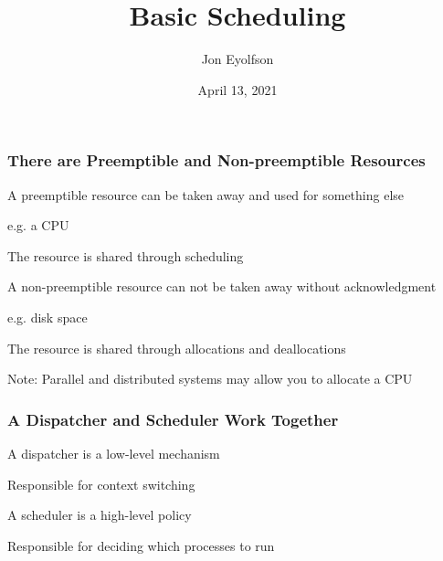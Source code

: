 

\title{Basic Scheduling}
\author{Jon Eyolfson}
\date{April 13, 2021}


  \begin{frame}
    \titlepage
  \end{frame}

  \begin{frame}
    \frametitle{There are Preemptible and Non-preemptible Resources}

    A preemptible resource can be taken away and used for something else

    \hspace{2em} e.g. a CPU

    \vspace{2em}

    The resource is shared through scheduling

    \vspace{4em}

    A non-preemptible resource can not be taken away without acknowledgment

    \hspace{2em} e.g. disk space

    \vspace{2em}

    The resource is shared through allocations and deallocations

    \hspace{2em} Note: Parallel and distributed systems may allow you to allocate a CPU
  \end{frame}

  \begin{frame}
    \frametitle{A Dispatcher and Scheduler Work Together}

    A dispatcher is a low-level mechanism

    \hspace{2em} Responsible for context switching

    \vspace{2em}

    A scheduler is a high-level policy

    \hspace{2em} Responsible for deciding which processes to run
  \end{frame}

